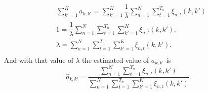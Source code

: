 \documentclass[12pt]{article}%
\begin{document}
\begin{equation}
\begin{split}
& \sum \limits_{k'=1}^{K}a_{k,k'} = \sum \limits_{k'=1}^{K} \dfrac{1}{\lambda} \sum \limits_{n=1}^{N}\sum _ { t = 1 } ^ { T _ { n } } \xi_{n,t}(k,k')\\
& 1 = \dfrac{1}{\lambda} \sum \limits_{n=1}^{N}\sum _ { t = 1 } ^ { T _ { n } }\sum \limits_{k'=1}^{K}\xi_{n,t}(k,k'),\\
& \lambda = \sum \limits_{n=1}^{N}\sum \limits_{ t = 1 } ^ { T _ { n }}\sum \limits_{k'=1}^{K}\xi_{n,t}(k,k').\\
\end{split}
\end{equation}
And with that value of $\lambda$ the estimated value of $a_{k,k'}$ is
\begin{equation}
\widehat{a}_{k,k'} = \dfrac{\sum \limits_{n=1}^{N} \sum \limits_ { t = 1 } ^ { T _ { n } }\xi_{n,t}(k,k')}{\sum \limits_{n=1}^{N}\sum \limits_ { t = 1 } ^ { T _ { n } }\sum \limits_{k'=1}^{K}\xi_{n,t}(k,k')}.
\end{equation}
\end{document}

